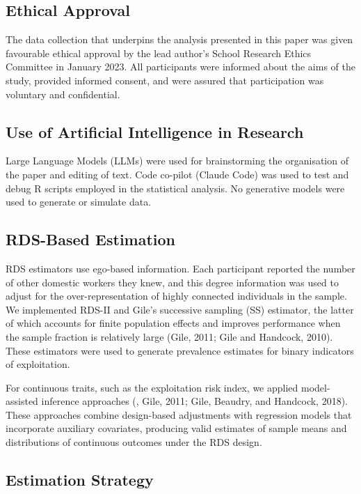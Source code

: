 \documentclass[
  12pt,
  letterpaper,
  DIV=11,
  numbers=noendperiod]{scrartcl}
\theoremstyle{plain}
\theoremstyle{definition}
\begin{document}
\subsection{Ethical Approval}\label{ethical-approval}

The data collection that underpins the analysis presented in this paper
was given favourable ethical approval by the lead author's School
Research Ethics Committee in January 2023. All participants were
informed about the aims of the study, provided informed consent, and
were assured that participation was voluntary and confidential.

\subsection{Use of Artificial Intelligence in
Research}\label{use-of-artificial-intelligence-in-research}

Large Language Models (LLMs) were used for brainstorming the
organisation of the paper and editing of text. Code co-pilot (Claude
Code) was used to test and debug R scripts employed in the statistical
analysis. No generative models were used to generate or simulate data.

\subsection{RDS-Based Estimation}\label{rds-based-estimation}

RDS estimators use ego-based information. Each participant reported the
number of other domestic workers they knew, and this degree information
was used to adjust for the over-representation of highly connected
individuals in the sample. We implemented RDS-II and Gile's successive
sampling (SS) estimator, the latter of which accounts for finite
population effects and improves performance when the sample fraction is
relatively large (Gile, 2011; Gile and Handcock, 2010). These estimators
were used to generate prevalence estimates for binary indicators of
exploitation.

For continuous traits, such as the exploitation risk index, we applied
model-assisted inference approaches (\textcite{gile15-network}, Gile,
2011; Gile, Beaudry, and Handcock, 2018). These approaches combine
design-based adjustments with regression models that incorporate
auxiliary covariates, producing valid estimates of sample means and
distributions of continuous outcomes under the RDS design.

\subsection{Estimation Strategy}\label{estimation-strategy}
\end{document}
